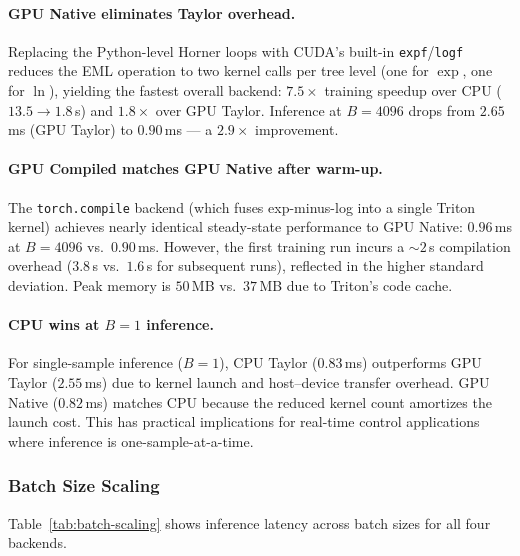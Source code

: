 \documentclass[11pt]{article}
\begin{document}
\paragraph{GPU Native eliminates Taylor overhead.}
Replacing the Python-level Horner loops with CUDA's built-in \texttt{expf}/\texttt{logf}
reduces the EML operation to two kernel calls per tree level (one for $\exp$,
one for $\ln$), yielding the fastest overall backend:
$7.5\times$ training speedup over CPU ($13.5 \to 1.8$\,s) and
$1.8\times$ over GPU Taylor.  Inference at $B\!=\!4096$ drops from
$2.65$\,ms (GPU Taylor) to $0.90$\,ms --- a $2.9\times$ improvement.

\paragraph{GPU Compiled matches GPU Native after warm-up.}
The \texttt{torch.compile} backend (which fuses exp-minus-log into a single
Triton kernel) achieves nearly identical steady-state performance to GPU
Native: $0.96$\,ms at $B\!=\!4096$ vs.\ $0.90$\,ms.  However, the first
training run incurs a ${\sim}2$\,s compilation overhead ($3.8$\,s vs.\ $1.6$\,s
for subsequent runs), reflected in the higher standard deviation.  Peak
memory is $50$\,MB vs.\ $37$\,MB due to Triton's code cache.

\paragraph{CPU wins at $B\!=\!1$ inference.}
For single-sample inference ($B\!=\!1$), CPU Taylor ($0.83$\,ms) outperforms
GPU Taylor ($2.55$\,ms) due to kernel launch and host--device transfer overhead.
GPU Native ($0.82$\,ms) matches CPU because the reduced kernel count amortizes
the launch cost.  This has practical implications for real-time control
applications where inference is one-sample-at-a-time.


\subsubsection{Batch Size Scaling}

Table~\ref{tab:batch-scaling} shows inference latency across batch sizes
for all four backends.
\end{document}

